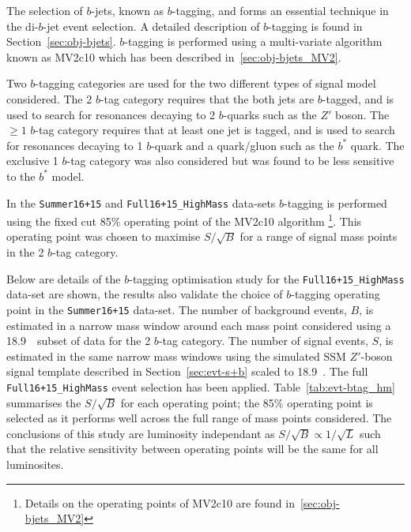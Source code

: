 The selection of $b$-jets, known as $b$-tagging,
and forms an essential technique in the di-$b$-jet event selection.
A detailed description of $b$-tagging is found in Section~\ref{sec:obj-bjets}.
$b$-tagging is performed using a multi-variate algorithm known as MV2c10 which has been described in~\ref{sec:obj-bjets_MV2}.

Two $b$-tagging categories are used for the two different types of signal model considered.
The 2 $b$-tag category requires that the both jets are $b$-tagged,
and is used to search for resonances decaying to 2 $b$-quarks such as the $Z'$ boson.
The $\geq 1$ $b$-tag category requires that at least one jet is tagged,
and is used to search for resonances decaying to 1 $b$-quark and a quark/gluon such as the $b^*$ quark.
The exclusive 1 $b$-tag category was also considered but was found to be less sensitive to the $b^*$ model.

In the \verb|Summer16+15| and \verb|Full16+15_HighMass| data-sets
$b$-tagging is performed using the fixed cut 85\% operating point of the MV2c10 algorithm
\footnote{Details on the operating points of MV2c10 are found in~\ref{sec:obj-bjets_MV2}}.
This operating point was chosen to maximise $S/\sqrt{B}$ for a range of signal mass points in the 2 $b$-tag category.

Below are details of the $b$-tagging optimisation study for the \verb|Full16+15_HighMass| data-set are shown,
the results also validate the choice of $b$-tagging operating point in the \verb|Summer16+15| data-set.
The number of background events, $B$, is estimated in
a narrow mass window around
each mass point considered using a
18.9~\ifb~subset of data for the 2 $b$-tag category.
The number of signal events, $S$, is estimated
in the same narrow mass windows using 
the simulated SSM $Z'$-boson signal template
described in Section~\ref{sec:evt-s+b} scaled to 18.9~\ifb.
The full \verb|Full16+15_HighMass| event selection has been applied.
Table~\ref{tab:evt-btag_hm} summarises the $S/\sqrt{B}$ for each operating point;
the 85\% operating point is selected as it performs well across the full range of mass points considered.
The conclusions of this study are luminosity independant
as $S/\sqrt{B} \propto 1/\sqrt{L}$ such that the relative sensitivity
between operating points will be the same for all luminosites.

